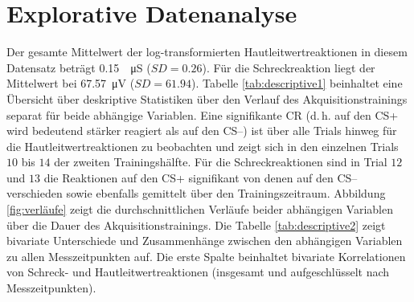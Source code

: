 

	\section{Explorative Datenanalyse}		\label{descriptive}
	
	Der gesamte Mittelwert der log-transformierten Hautleitwertreaktionen in diesem Datensatz beträgt \SI{0.15}{\log\micro\siemens} ($SD=0.26$). Für die Schreckreaktion liegt der Mittelwert bei \SI{67.57}{\micro\volt} ($SD=61.94$).
	Tabelle \ref{tab:descriptive1} beinhaltet eine Übersicht über deskriptive Statistiken über den Verlauf des Akquisitionstrainings separat für beide abhängige Variablen. Eine signifikante CR (d.\,h. auf den CS+ wird bedeutend stärker reagiert als auf den CS--) ist über alle Trials hinweg für die Hautleitwertreaktionen zu beobachten und zeigt sich in den einzelnen Trials $10$ bis $14$ der zweiten Trainingshälfte. Für die Schreckreaktionen sind in Trial $12$ und $13$ die Reaktionen auf den CS+ signifikant von denen auf den CS-- verschieden sowie ebenfalls gemittelt über den Trainingszeitraum. Abbildung \ref{fig:verläufe} zeigt die durchschnittlichen Verläufe beider abhängigen Variablen über die Dauer des Akquisitionstrainings.
	Die Tabelle \ref{tab:descriptive2} zeigt bivariate Unterschiede und Zusammenhänge zwischen den abhängigen Variablen zu allen Messzeitpunkten auf. Die erste Spalte beinhaltet bivariate Korrelationen von Schreck- und Hautleitwertreaktionen (insgesamt und aufgeschlüsselt nach Messzeitpunkten). 

